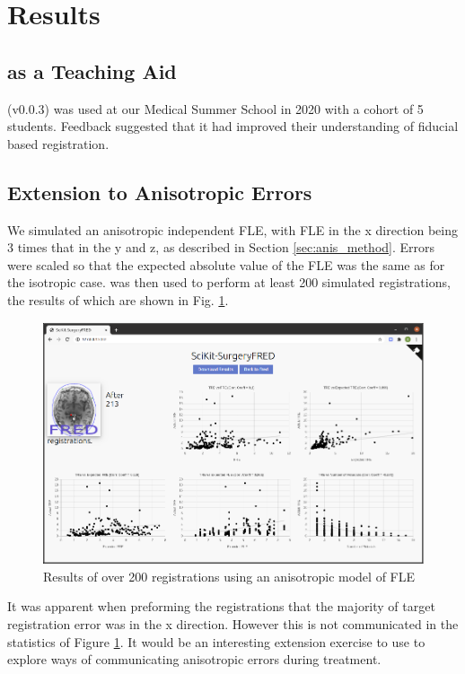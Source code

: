 \section{Results}
\subsection{\fred as a Teaching Aid}

\fred (v0.0.3)\cite{stephen_thompson_2020_3946090} was used at our Medical Summer School in 2020 with a cohort of 5 students. Feedback suggested that it had improved their understanding
of fiducial based registration. 

\subsection{Extension to Anisotropic Errors}
We simulated an anisotropic independent \gls{FLE}, with \gls{FLE} in the x 
direction being 3 times that in the y and z, as described in Section \ref{sec:anis_method}.
Errors were scaled so that the 
expected absolute value of the \gls{FLE} was the same as for the isotropic case. 
\fred was then used to perform at least 200 simulated registrations, the results of
which are shown in Fig. \ref{fig:anis_error}. 

\begin{figure}
	\begin{center}
			\includegraphics[width=0.9\linewidth]{images/anisitropic_error.eps}
		\caption{\label{fig:anis_error}Results of over 200 registrations using an anisotropic model of {FLE}}
	\end{center}
\end{figure}

It was apparent when preforming the registrations that the majority of target 
registration error was in the x direction. However this is not communicated in the 
statistics of Figure \ref{fig:anis_error}. It would be an interesting extension 
exercise to use \fred to explore ways of communicating anisotropic errors during 
treatment.

